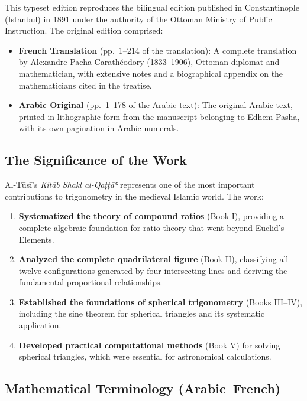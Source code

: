 \documentclass[11pt,a4paper]{article}
\theoremstyle{plain}
\theoremstyle{definition}
\theoremstyle{remark}
\begin{document}
This typeset edition reproduces the bilingual edition published in Constantinople (Istanbul) in 1891 under the authority of the Ottoman Ministry of Public Instruction. The original edition comprised:

\begin{itemize}
\item \textbf{French Translation} (pp.~1--214 of the translation): A complete translation by Alexandre Pacha Carathéodory (1833--1906), Ottoman diplomat and mathematician, with extensive notes and a biographical appendix on the mathematicians cited in the treatise.
\item \textbf{Arabic Original} (pp.~1--178 of the Arabic text): The original Arabic text, printed in lithographic form from the manuscript belonging to Edhem Pasha, with its own pagination in Arabic numerals.
\end{itemize}

\subsection*{The Significance of the Work}

Al-Tūsī's \textit{Kitāb Shakl al-Qaṭṭāʿ} represents one of the most important contributions to trigonometry in the medieval Islamic world. The work:

\begin{enumerate}
\item \textbf{Systematized the theory of compound ratios} (Book I), providing a complete algebraic foundation for ratio theory that went beyond Euclid's Elements.
\item \textbf{Analyzed the complete quadrilateral figure} (Book II), classifying all twelve configurations generated by four intersecting lines and deriving the fundamental proportional relationships.
\item \textbf{Established the foundations of spherical trigonometry} (Books III--IV), including the sine theorem for spherical triangles and its systematic application.
\item \textbf{Developed practical computational methods} (Book V) for solving spherical triangles, which were essential for astronomical calculations.
\end{enumerate}

\subsection*{Mathematical Terminology (Arabic--French)}
\end{document}
